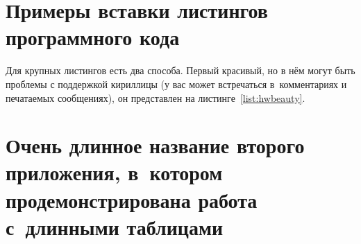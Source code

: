 \chapter{Примеры вставки листингов программного кода} \label{AppendixA}

Для крупных листингов есть два способа. Первый красивый, но в нём могут быть
проблемы с поддержкой кириллицы (у вас может встречаться в~комментариях
и печатаемых сообщениях), он представлен на листинге~\ref{list:hwbeauty}.



\chapter{Очень длинное название второго приложения, в~котором продемонстрирована работа с~длинными таблицами} \label{AppendixB}

